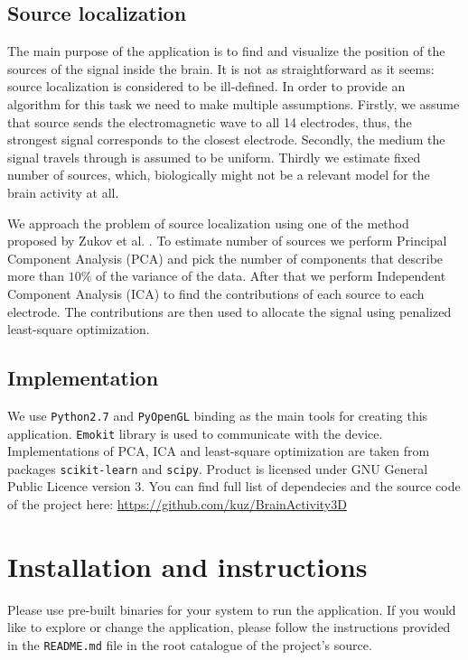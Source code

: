 \documentclass[twocolumn]{article}
\begin{document}
\subsection*{Source localization}
The main purpose of the application is to find and visualize the position of the sources of the signal inside the brain. It is not as straightforward as it seems: source localization is considered to be ill-defined. In order to provide an algorithm for this task we need to make multiple assumptions. Firstly, we assume that source sends the electromagnetic wave to all 14 electrodes, thus, the strongest signal corresponds to the closest electrode. Secondly, the medium the signal travels through is assumed to be uniform. Thirdly we estimate fixed number of sources, which, biologically might not be a relevant model for the brain activity at all.

We approach the problem of source localization using one of the method proposed by Zukov et al. \cite{zhukov2000}. To estimate number of sources we perform Principal Component Analysis (PCA) and pick the number of components that describe more than $10\%$ of the variance of the data. After that we perform Independent Component Analysis (ICA) to find the contributions of each source to each electrode. The contributions are then used to allocate the signal using penalized least-square optimization.

\subsection*{Implementation}
We use \texttt{Python2.7} and \texttt{PyOpenGL} binding as the main tools for creating this application. \texttt{Emokit} library is used to communicate with the device. Implementations of PCA, ICA and least-square optimization are taken from packages \texttt{scikit-learn}\cite{scikit-learn} and \texttt{scipy}\cite{scipy}. Product is licensed under GNU General Public Licence version 3. You can find full list of dependecies and the source code of the project here: \url{https://github.com/kuz/BrainActivity3D}

%
%
\section*{Installation and instructions}
Please use pre-built binaries for your system to run the application. If you would like to explore or change the application, please follow the instructions provided in the \texttt{README.md} file in the root catalogue of the project's source.
\end{document}
